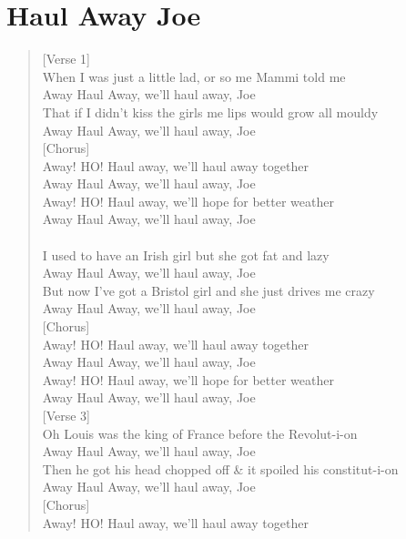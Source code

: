 \documentclass[11pt]{article}
\begin{document}
\section{Haul Away Joe}
\label{sec:org5393d8c}
\begin{verse}
[Verse 1]\\
When I was just a little lad, or so me Mammi told me\\
Away Haul Away, we'll haul away, Joe\\
That if I didn't kiss the girls me lips would grow all mouldy\\
Away Haul Away, we'll haul away, Joe\\
\vspace*{1em}
[Chorus]\\
Away! HO! Haul away, we'll haul away together\\
Away Haul Away, we'll haul away, Joe\\
Away! HO! Haul away, we'll hope for better weather\\
Away Haul Away, we'll haul away, Joe\\
[Verse 2]\\
I used to have an Irish girl but she got fat and lazy\\
Away Haul Away, we'll haul away, Joe\\
But now I've got a Bristol girl and she just drives me crazy\\
Away Haul Away, we'll haul away, Joe\\
\vspace*{1em}
[Chorus]\\
Away! HO! Haul away, we'll haul away together\\
Away Haul Away, we'll haul away, Joe\\
Away! HO! Haul away, we'll hope for better weather\\
Away Haul Away, we'll haul away, Joe\\
\vspace*{1em}
[Verse 3]\\
Oh Louis was the king of France before the Revolut-i-on\\
Away Haul Away, we'll haul away, Joe\\
Then he got his head chopped off \& it spoiled his constitut-i-on\\
Away Haul Away, we'll haul away, Joe\\
\vspace*{1em}
[Chorus]\\
Away! HO! Haul away, we'll haul away together\\

\end{verse}
\end{document}
